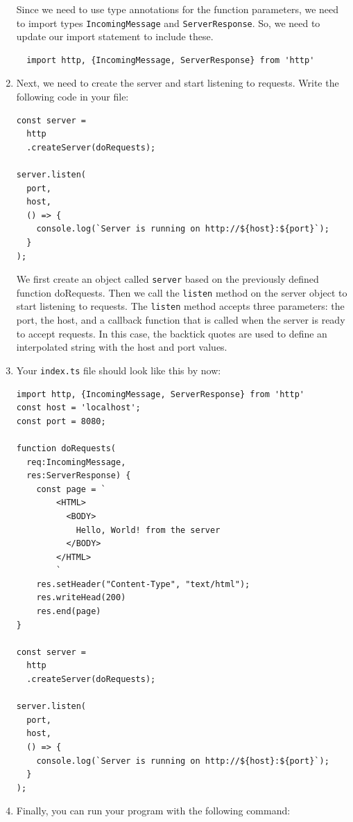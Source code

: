 \documentclass[12pt,a5paper]{memoir}
\begin{document}
\begin{enumerate}
Since we need to use type annotations for the function parameters, we need to
import types \texttt{IncomingMessage} and \texttt{ServerResponse}. So, we need to update
our import statement to include these.

\begin{lstlisting}
  import http, {IncomingMessage, ServerResponse} from 'http'
\end{lstlisting}

\item Next, we need to create the server and start listening to requests. Write
the following code in your file:

\begin{lstlisting}
const server = 
  http
  .createServer(doRequests);

server.listen(
  port, 
  host, 
  () => {
    console.log(`Server is running on http://${host}:${port}`);
  }
);
\end{lstlisting}

We first create an object called \texttt{server} based on the previously defined
function doRequests. Then we call the \texttt{listen} method on the server
object to start listening to requests. The \texttt{listen} method accepts three
parameters: the port, the host, and a callback function that is called when the
server is ready to accept requests.
%
In this case, the backtick quotes are used to define an interpolated string with
the host and port values.

\item
Your \texttt{index.ts} file should look like this by now:

\begin{lstlisting}
import http, {IncomingMessage, ServerResponse} from 'http'
const host = 'localhost';
const port = 8080;

function doRequests(
  req:IncomingMessage, 
  res:ServerResponse) {
    const page = `
        <HTML>
          <BODY>
            Hello, World! from the server
          </BODY>
        </HTML>
        `
    res.setHeader("Content-Type", "text/html");
    res.writeHead(200)
    res.end(page)
}

const server = 
  http
  .createServer(doRequests);

server.listen(
  port, 
  host, 
  () => {
    console.log(`Server is running on http://${host}:${port}`);
  }
);
\end{lstlisting}


\item Finally, you can run your program with the following command:



\end{enumerate}
\end{document}
